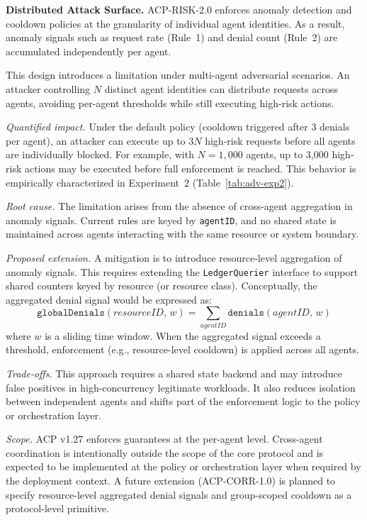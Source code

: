 \documentclass[11pt]{article}
\theoremstyle{definition}
\begin{document}
\textbf{Distributed Attack Surface.}
\label{sec:distributed-attack-surface}
ACP-RISK-2.0 enforces anomaly detection and cooldown policies at the granularity of individual
agent identities. As a result, anomaly signals such as request rate (Rule~1) and denial count
(Rule~2) are accumulated independently per agent.

This design introduces a limitation under multi-agent adversarial scenarios. An attacker
controlling $N$ distinct agent identities can distribute requests across agents, avoiding
per-agent thresholds while still executing high-risk actions.

\emph{Quantified impact.}
Under the default policy (cooldown triggered after 3 denials per agent), an attacker can
execute up to $3N$ high-risk requests before all agents are individually blocked.
For example, with $N = 1{,}000$ agents, up to 3{,}000 high-risk actions may be executed
before full enforcement is reached. This behavior is empirically characterized in
Experiment~2 (Table~\ref{tab:adv-exp2}).

\emph{Root cause.}
The limitation arises from the absence of cross-agent aggregation in anomaly signals.
Current rules are keyed by \texttt{agentID}, and no shared state is maintained across
agents interacting with the same resource or system boundary.

\emph{Proposed extension.}
A mitigation is to introduce resource-level aggregation of anomaly signals. This requires
extending the \texttt{LedgerQuerier} interface to support shared counters keyed by resource
(or resource class). Conceptually, the aggregated denial signal would be expressed as:
\[
\texttt{globalDenials}(\mathit{resourceID},\, w)
  = \sum_{\mathit{agentID}} \texttt{denials}(\mathit{agentID},\, w)
\]
where $w$ is a sliding time window.
When the aggregated signal exceeds a threshold, enforcement (e.g., resource-level cooldown)
is applied across all agents.

\emph{Trade-offs.}
This approach requires a shared state backend and may introduce false positives in
high-concurrency legitimate workloads. It also reduces isolation between independent
agents and shifts part of the enforcement logic to the policy or orchestration layer.

\emph{Scope.}
ACP v1.27 enforces guarantees at the per-agent level. Cross-agent coordination is
intentionally outside the scope of the core protocol and is expected to be implemented
at the policy or orchestration layer when required by the deployment context.
A future extension (ACP-CORR-1.0) is planned to specify resource-level aggregated
denial signals and group-scoped cooldown as a protocol-level primitive.
\end{document}
